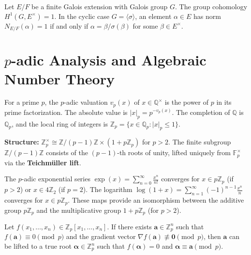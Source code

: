 \begin{theorem}
Let $E/F$ be a finite Galois extension with Galois group $G$. The group cohomology $H^1(G, E^\times) = 1$. In the cyclic case $G = \langle \sigma \rangle$, an element $\alpha \in E$ has norm $N_{E/F}(\alpha) = 1$ if and only if $\alpha = \beta / \sigma(\beta)$ for some $\beta \in E^\times$.
\end{theorem}

\section{$p$-adic Analysis and Algebraic Number Theory}

\begin{definition}
For a prime $p$, the $p$-adic valuation $v_p(x)$ of $x \in \mathbb{Q}^\times$ is the power of $p$ in its prime factorization. The absolute value is $|x|_p = p^{-v_p(x)}$. The completion of $\mathbb{Q}$ is $\mathbb{Q}_p$, and the local ring of integers is $\mathbb{Z}_p = \{x \in \mathbb{Q}_p : |x|_p \le 1\}$. 

\textbf{Structure:} $\mathbb{Z}_p^\times \cong \mathbb{Z}/(p-1)\mathbb{Z} \times (1 + p\mathbb{Z}_p)$ for $p>2$. The finite subgroup $\mathbb{Z}/(p-1)\mathbb{Z}$ consists of the $(p-1)$-th roots of unity, lifted uniquely from $\mathbb{F}_p^\times$ via the \textbf{Teichm\"uller lift}.
\end{definition}

\begin{definition}
The $p$-adic exponential series $\exp(x) = \sum_{n=0}^\infty \frac{x^n}{n!}$ converges for $x \in p\mathbb{Z}_p$ (if $p>2$) or $x \in 4\mathbb{Z}_2$ (if $p=2$). The logarithm $\log(1+x) = \sum_{n=1}^\infty (-1)^{n-1} \frac{x^n}{n}$ converges for $x \in p\mathbb{Z}_p$. These maps provide an isomorphism between the additive group $p\mathbb{Z}_p$ and the multiplicative group $1+p\mathbb{Z}_p$ (for $p>2$).
\end{definition}

\begin{theorem}
Let $f(x_1, \dots, x_n) \in \mathbb{Z}_p[x_1, \dots, x_n]$. If there exists $\mathbf{a} \in \mathbb{Z}_p^n$ such that $f(\mathbf{a}) \equiv 0 \pmod p$ and the gradient vector $\nabla f(\mathbf{a}) \not\equiv \mathbf{0} \pmod p$, then $\mathbf{a}$ can be lifted to a true root $\mathbf{\alpha} \in \mathbb{Z}_p^n$ such that $f(\mathbf{\alpha}) = 0$ and $\mathbf{\alpha} \equiv \mathbf{a} \pmod p$.
\end{theorem}


